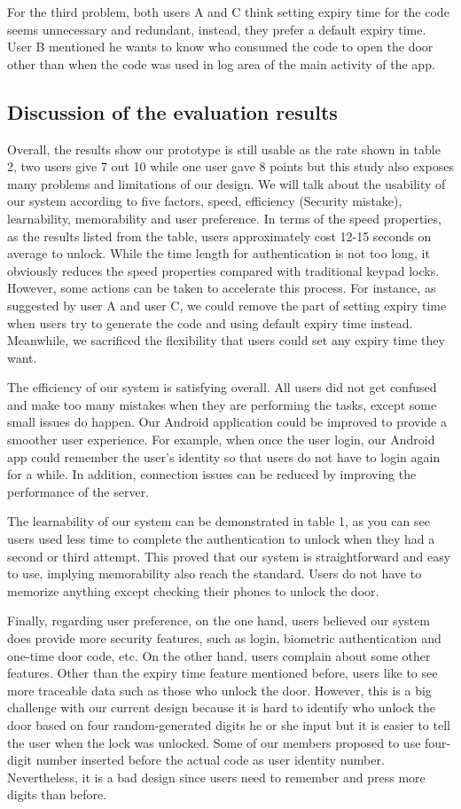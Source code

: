 \documentclass[conference]{IEEEtran}
\begin{document}
For the third problem, both users A and C think setting expiry time for the code seems unnecessary and redundant, instead, they prefer a default expiry time. User B mentioned he wants to know who consumed the code to open the door other than when the code was used in log area of the main activity of the app.

\subsection{Discussion of the evaluation results}
Overall, the results show our prototype is still usable as the rate shown in table 2, two users give 7 out 10 while one user gave 8 points but this study also exposes many problems and limitations of our design. We will talk about the usability of our system according to five factors, speed, efficiency (Security mistake), learnability, memorability and user preference.
In terms of the speed properties, as the results listed from the table, users approximately cost 12-15 seconds on average to unlock. While the time length for authentication is not too long, it obviously reduces the speed properties compared with traditional keypad locks. However, some actions can be taken to accelerate this process. For instance, as suggested by user A and user C, we could remove the part of setting expiry time when users try to generate the code and using default expiry time instead. Meanwhile, we sacrificed the flexibility that users could set any expiry time they want.

The efficiency of our system is satisfying overall. All users did not get confused and make too many mistakes when they are performing the tasks, except some small issues do happen. Our Android application could be improved to provide a smoother user experience. For example, when once the user login, our Android app could remember the user’s identity so that users do not have to login again for a while. In addition, connection issues can be reduced by improving the performance of the server.

The learnability of our system can be demonstrated in table 1, as you can see users used less time to complete the authentication to unlock when they had a second or third attempt. This proved that our system is straightforward and easy to use, implying memorability also reach the standard. Users do not have to memorize anything except checking their phones to unlock the door.

Finally, regarding user preference, on the one hand, users believed our system does provide more security features, such as login, biometric authentication and one-time door code, etc. On the other hand, users complain about some other features. Other than the expiry time feature mentioned before, users like to see more traceable data such as those who unlock the door. However, this is a big challenge with our current design because it is hard to identify who unlock the door based on four random-generated digits he or she input but it is easier to tell the user when the lock was unlocked. Some of our members proposed to use four-digit number inserted before the actual code as user identity number. Nevertheless, it is a bad design since users need to remember and press more digits than before.
\end{document}
